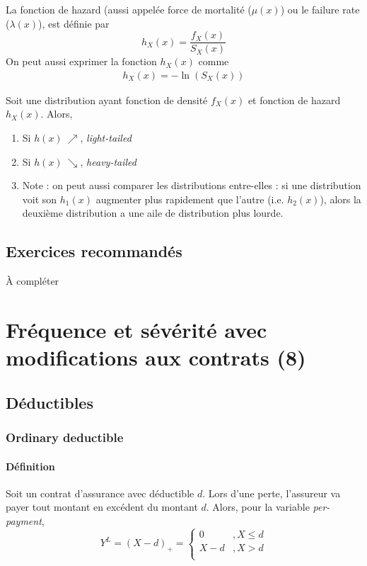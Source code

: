 \documentclass[12pt, french]{report}
\begin{document}
\begin{definition}
La fonction de hazard (aussi appelée force de mortalité ($\mu(x)$) ou le failure rate ($\lambda(x)$), est définie par
\begin{equation}
h_X(x) = \frac{f_X(x)}{S_X(x)}
\end{equation}
On peut aussi exprimer la fonction $h_X(x)$ comme
\begin{align*}
h_X(x) = - \ln (S_X(x))
\end{align*}
\end{definition}
Soit une distribution ayant fonction de densité $f_X(x)$ et fonction de hazard $h_X(x)$. Alors,
\begin{enumerate}[label=\faAngleRight]
\item Si $h(x) \ \nearrow$, \textit{light-tailed}
\item Si $h(x) \ \searrow$, \textit{heavy-tailed}
\item Note : on peut aussi comparer les distributions entre-elles : si une distribution voit son $h_1(x)$ augmenter plus rapidement que l'autre (i.e. $h_2(x)$), alors la deuxième distribution a une aile de distribution plus lourde.
\end{enumerate}

\section{Exercices recommandés}
À compléter


\chapter{Fréquence et sévérité avec modifications aux contrats (8)}
\setcounter{section}{1}
\section{Déductibles}
\subsection{Ordinary deductible}
\subsubsection{Définition}
Soit un contrat d'assurance avec déductible $d$. Lors d'une perte, l'assureur va payer tout montant en excédent du montant $d$. Alors, pour la variable \textit{per-payment},
\begin{equation}
Y^L = (X-d)_+ = 
\begin{cases}
0		& , X \leq d \\
X - d	& , X > d \\
\end{cases}
\end{equation}
\end{document}
